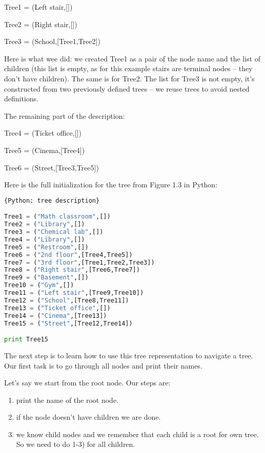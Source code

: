 Tree1 = (Left stair,[])

Tree2 = (Right stair,[]) 

Tree3 = (School,[Tree1,Tree2])

Here is what wee did: we created Tree1 as a pair of the node
name and the list of children (this list is empty, as for this example
stairs are terminal nodes -- they don't have children). 
The same is for Tree2. The list for Tree3 is not empty, it's constructed
from two previously defined trees -- we reuse trees to avoid
nested definitions. 

The remaining part of the description:

Tree4 = (Ticket office,[])

Tree5 = (Cinema,[Tree4])

Tree6 = (Street,[Tree3,Tree5])


Here is the full initialization for the tree from Figure 1.3 in Python:

\begin{lstlisting}[style=codelst,language=Python]{Python: tree description}

Tree1 = ("Math classroom",[])
Tree2 = ("Library",[])
Tree3 = ("Chemical lab",[])
Tree4 = ("Library",[])
Tree5 = ("Restroom",[])
Tree6 = ("2nd floor",[Tree4,Tree5])
Tree7 = ("3rd floor",[Tree1,Tree2,Tree3])
Tree8 = ("Right stair",[Tree6,Tree7])
Tree9 = ("Basement",[])
Tree10 = ("Gym",[])
Tree11 = ("Left stair",[Tree9,Tree10])
Tree12 = ("School",[Tree8,Tree11])
Tree13 = ("Ticket office",[])
Tree14 = ("Cinema",[Tree13])
Tree15 = ("Street",[Tree12,Tree14])

print Tree15
\end{lstlisting}

The next step is to learn how to use this tree representation to navigate
a tree. Our first task is to go through all nodes and print their names.

Let's say we start from the root node. Our steps are:

\begin{leftborder}
\begin{enumerate}
\item print the name of the root node.
\item if the node doesn't have children we are done.
\item we know child nodes and we remember that each child is a root for own tree.
So we need to do 1-3) for all children.
\end{enumerate}
\end{leftborder}

